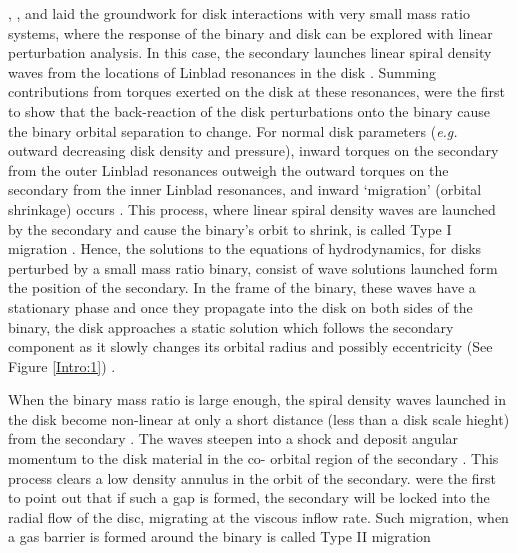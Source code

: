 \cite{LinPapa:1979a}, \cite{GT79}, and \cite{GT80} laid the groundwork for
disk interactions with very small mass ratio systems, where the response of
the binary and disk can be explored with linear perturbation analysis. In this
case, the secondary launches linear spiral density waves from the locations of
Linblad resonances in the disk \citep{LyndenBellKalnajs:1972}. Summing
contributions from torques exerted on the disk at these resonances,
\cite{GT80} were the first to show that the back-reaction of the disk
perturbations onto the binary cause the binary orbital separation to change.
For normal disk parameters (\emph{e.g.} outward decreasing disk density and
pressure), inward torques on the secondary from the outer Linblad resonances
outweigh the outward torques on the secondary from the inner Linblad
resonances, and inward `migration' (orbital shrinkage) occurs
\cite{Ward:1986}. This process, where linear spiral density waves are launched
by the secondary and cause the binary's orbit to shrink, is called Type I
migration \citep[See also][]{MeyerVernetSicardy:1987, Ward:1997, Tanaka:2002}.
Hence, the solutions to the equations of hydrodynamics, for disks perturbed by
a small mass ratio binary, consist of wave solutions launched form the
position of the secondary. In the frame of the binary, these waves have a
stationary phase and once they propagate into the disk on both sides of the
binary, the disk approaches a static solution which follows the secondary
component as it slowly changes its orbital radius and possibly eccentricity
(See Figure \ref{Intro:1}) \citep{GT80, Ward:1988, GoldriechSari:2003}.





When the binary mass ratio is large enough, the spiral density waves launched
in the disk become non-linear at only a short distance (less than a disk scale
hieght) from the secondary \citep{GoodmanRafikov:2001}. The waves steepen into
a shock and deposit angular momentum to the disk material in the co- orbital
region of the secondary \citep{RafikovDong:2012, LinPapa, chapter 3...}. This
process clears a low density annulus in the orbit of the secondary.
\cite{LinPapa:1986b} were the first to point out that if such a gap is formed,
the secondary will be locked into the radial flow of the disc, migrating at
the viscous inflow rate. Such migration, when a gas barrier is formed around
the binary is called Type II migration \citep[see also][and Chapter 3]{Ward:1997, KleyNelson:2013, ...}



